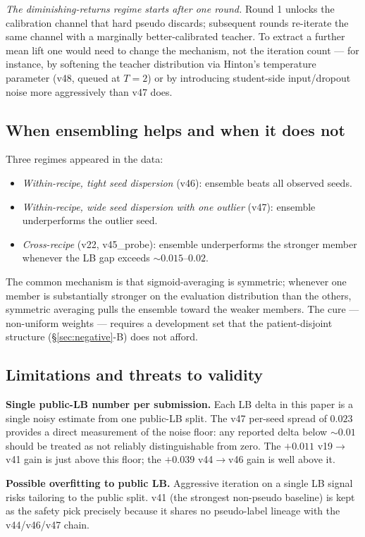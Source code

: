 \documentclass[conference]{IEEEtran}
\begin{document}
\emph{The diminishing-returns regime starts after one round.} Round 1 unlocks the calibration channel that hard pseudo discards; subsequent rounds re-iterate the same channel with a marginally better-calibrated teacher. To extract a further mean lift one would need to change the mechanism, not the iteration count --- for instance, by softening the teacher distribution via Hinton's temperature parameter (v48, queued at $T=2$) or by introducing student-side input/dropout noise more aggressively than v47 does.

\subsection{When ensembling helps and when it does not}

Three regimes appeared in the data:
\begin{itemize}
  \item \emph{Within-recipe, tight seed dispersion} (v46): ensemble beats all observed seeds.
  \item \emph{Within-recipe, wide seed dispersion with one outlier} (v47): ensemble underperforms the outlier seed.
  \item \emph{Cross-recipe} (v22, v45\_probe): ensemble underperforms the stronger member whenever the LB gap exceeds $\sim$$0.015$--$0.02$.
\end{itemize}
The common mechanism is that sigmoid-averaging is symmetric; whenever one member is substantially stronger on the evaluation distribution than the others, symmetric averaging pulls the ensemble toward the weaker members. The cure --- non-uniform weights --- requires a development set that the patient-disjoint structure (\S\ref{sec:negative}-B) does not afford.

\subsection{Limitations and threats to validity}

\textbf{Single public-LB number per submission.} Each LB delta in this paper is a single noisy estimate from one public-LB split. The v47 per-seed spread of $0.023$ provides a direct measurement of the noise floor: any reported delta below $\sim$$0.01$ should be treated as not reliably distinguishable from zero. The $+0.011$ v19$\rightarrow$v41 gain is just above this floor; the $+0.039$ v44$\rightarrow$v46 gain is well above it.

\textbf{Possible overfitting to public LB.} Aggressive iteration on a single LB signal risks tailoring to the public split. v41 (the strongest non-pseudo baseline) is kept as the safety pick precisely because it shares no pseudo-label lineage with the v44/v46/v47 chain.
\end{document}
